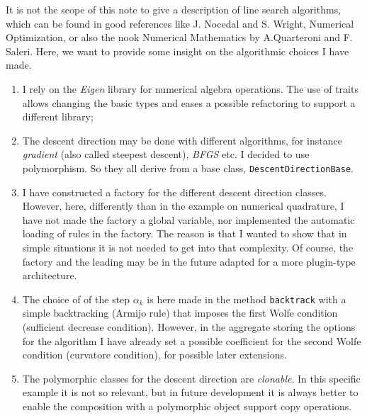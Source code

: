 \documentclass{article}
\newcommand{\li}{\lstinline}
\newcommand{\cpp}[1]{\li!#1!}
\begin{document}
It is not the scope of this note to give a description of line search algorithms, which can be found in good references like J. Nocedal and S. Wright, Numerical Optimization, or also the nook Numerical Mathematics by A.Quarteroni and F. Saleri.
Here, we want to provide some insight on the algorithmic choices I have made.
\begin{enumerate}
    \item I rely on the \emph{Eigen} library for numerical algebra operations. The use of traits allows changing the basic types and eases a possible refactoring to support a different library;
    \item The descent direction may be done with different algorithms, for instance \emph{gradient} (also called steepest descent), \emph{BFGS} etc. I decided to use polymorphism. So they all derive from a base class, \cpp{DescentDirectionBase}.
    \item I have constructed a factory for the different descent direction classes. However, here, differently than in the example on numerical quadrature, I have not made the factory a global variable, nor implemented the automatic loading of rules in the factory. The reason is that I wanted to show that in simple situations it is not needed to get into that complexity. Of course, the factory and the leading may be in the future adapted for a more plugin-type architecture.
    \item The choice of of the step $\alpha_k$ is here made in the method \cpp{backtrack} with a simple backtracking  (Armijo rule) that imposes the first Wolfe condition (sufficient decrease condition). However, in the aggregate storing the options for the algorithm I have already set a possible coefficient for the second Wolfe condition (curvatore condition), for possible later extensions.
    \item The polymorphic classes for the descent direction are \emph{clonable}. In this specific example it is not so relevant, but in future development it is always better to enable the composition with a polymorphic object support copy operations.  
\end{enumerate}
 
\end{document}
